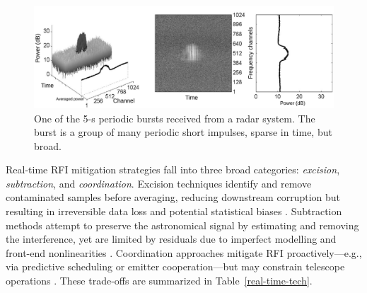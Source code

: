 \begin{figure}
    \centering
    \includegraphics[height=.20\textheight]{figures/radar.pdf}
    \caption{One of the 5-s periodic bursts received from a radar system.  The burst is a group of many periodic short impulses, sparse in time, but broad.  }
    \label{fig:rfi_example_radar}
\end{figure}

Real-time RFI mitigation strategies fall into three broad categories: \textit{excision}, \textit{subtraction}, and \textit{coordination}. Excision techniques identify and remove contaminated samples before averaging, reducing downstream corruption but resulting in irreversible data loss and potential statistical biases \citep{hugo2022tricolouroptimizedsumthresholdflagger,10464448}. Subtraction methods attempt to preserve the astronomical signal by estimating and removing the interference, yet are limited by residuals due to imperfect modelling and front-end nonlinearities \citep{ellingson2022coherent,chakraborty2024low}. Coordination approaches mitigate RFI proactively—e.g., via predictive scheduling or emitter cooperation—but may constrain telescope operations \citep{hellbourg2024assessing}. These trade-offs are summarized in Table~\ref{real-time-tech}.





